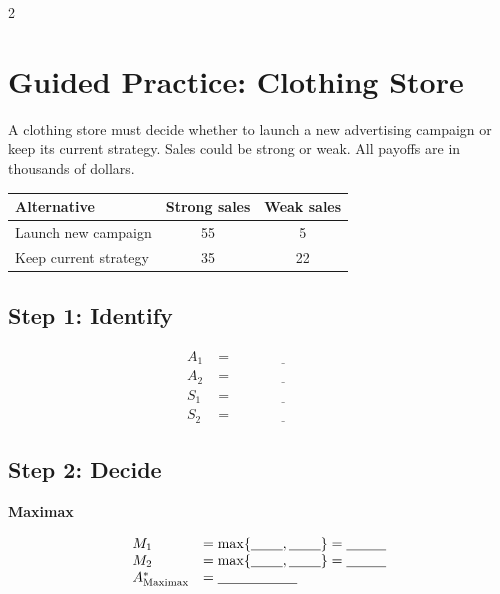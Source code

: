 \begin{multicols}{2}
		\section{Guided Practice: Clothing Store}
		A clothing store must decide whether to launch a new advertising campaign
		or keep its current strategy. Sales could be strong or weak. All payoffs are in thousands of dollars.
		\begin{center}
			\renewcommand{\arraystretch}{1.3}
			\small
			\begin{tabular}{lcc}
				\toprule
				Alternative & Strong sales  & Weak sales  \\
				\midrule
				Launch new campaign & 55 & 5 \\
				Keep current strategy & 35 & 22 \\
				\bottomrule
			\end{tabular}
		\end{center}
		\vspace{-5mm}
		\subsection*{Step 1: Identify}
		\[
		\begin{array}{ll}
			A_1 &= \underline{\hspace{3cm}} \\
			A_2 &= \underline{\hspace{3cm}} \\
			S_1 &= \underline{\hspace{3cm}} \\
			S_2 &= \underline{\hspace{3cm}}
		\end{array}
		\]
		
		\subsection*{Step 2: Decide}
		
		\textbf{Maximax}
		
		\[
		\begin{array}{ll}
			M_1 &= \max\{\underline{\hspace{0.8cm}},\underline{\hspace{0.8cm}}\}
			=\underline{\hspace{1cm}} \\
			M_2 &= \max\{\underline{\hspace{0.8cm}},\underline{\hspace{0.8cm}}\}
			=\underline{\hspace{1cm}} \\
			A^*_{\mathrm{Maximax}} &= \underline{\hspace{2cm}}
		\end{array}
		\]
		

\end{multicols}
